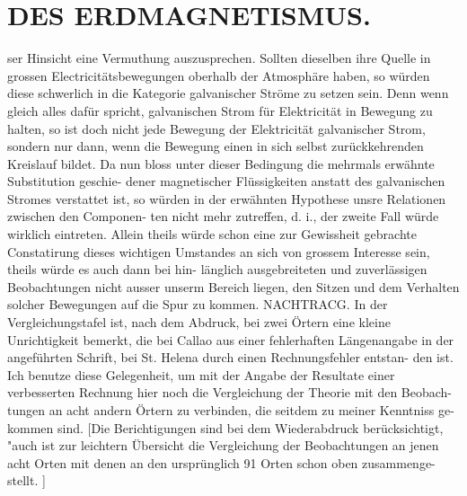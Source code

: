 \documentclass[12pt,a4paper]{article}
\begin{document}
\newpage


\section*{DES ERDMAGNETISMUS.}
ser Hinsicht eine Vermuthung auszusprechen. Sollten dieselben ihre Quelle in grossen Electricitätsbewegungen oberhalb der Atmosphäre haben, so würden diese schwerlich in die Kategorie galvanischer Ströme zu setzen sein. Denn wenn gleich alles dafür spricht, galvanischen Strom für Elektricität in Bewegung zu halten, so ist doch nicht jede Bewegung der Elektricität galvanischer Strom, sondern nur dann, wenn die Bewegung einen in sich selbst zurückkehrenden Kreislauf bildet. Da nun bloss unter dieser Bedingung die mehrmals erwähnte Substitution geschie- dener magnetischer Flüssigkeiten anstatt des galvanischen Stromes verstattet ist, so würden in der erwähnten Hypothese unsre Relationen zwischen den Componen- ten nicht mehr zutreffen, d. i., der zweite Fall würde wirklich eintreten. Allein theils würde schon eine zur Gewissheit gebrachte Constatirung dieses wichtigen Umstandes an sich von grossem Interesse sein, theils würde es auch dann bei hin- länglich ausgebreiteten und zuverlässigen Beobachtungen nicht ausser unserm Bereich liegen, den Sitzen und dem Verhalten solcher Bewegungen auf die Spur zu kommen. NACHTRACG. In der Vergleichungstafel ist, nach dem Abdruck, bei zwei Örtern eine kleine Unrichtigkeit bemerkt, die bei Callao aus einer fehlerhaften Längenangabe in der angeführten Schrift, bei St. Helena durch einen Rechnungsfehler entstan- den ist. Ich benutze diese Gelegenheit, um mit der Angabe der Resultate einer verbesserten Rechnung hier noch die Vergleichung der Theorie mit den Beobach- tungen an acht andern Örtern zu verbinden, die seitdem zu meiner Kenntniss ge- kommen sind. [Die Berichtigungen sind bei dem Wiederabdruck berücksichtigt, "auch ist zur leichtern Übersicht die Vergleichung der Beobachtungen an jenen acht Orten mit denen an den ursprünglich 91 Orten schon oben zusammenge- stellt. ]


\newpage
\end{document}
